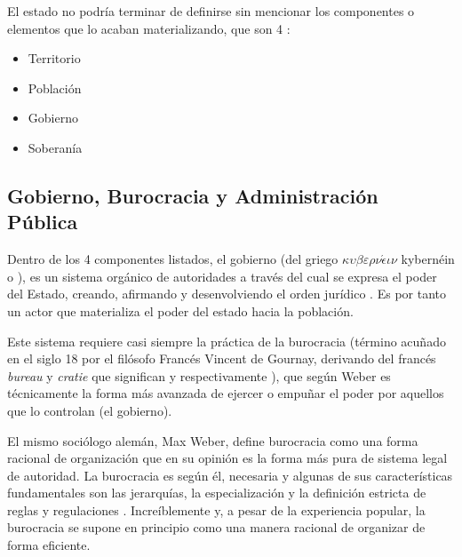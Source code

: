El estado no podría terminar de definirse sin mencionar los componentes o elementos que lo acaban materializando, que son 4 \cite{delarocharadaElementosParaTeoria2019}:

\begin{itemize}
    \item Territorio
    \item Población
    \item Gobierno
    \item Soberanía
\end{itemize}

\subsection{Gobierno, Burocracia y Administración Pública}

Dentro de los 4 componentes listados, el gobierno 
(del griego $\kappa \upsilon \beta \varepsilon \rho \nu \acute{\epsilon} \iota \nu$ kybernéin  o ), 
es un sistema orgánico de autoridades a través del cual se expresa el poder del Estado, creando, afirmando y desenvolviendo el orden jurídico \cite{fernandezruizDerechoParlamentario2023}. 
Es por tanto un actor que materializa el poder del estado hacia la población.

Este sistema requiere casi siempre la práctica de la burocracia 
(término acuñado en el siglo 18 por el filósofo Francés Vincent de Gournay, derivando del francés \textit{bureau} y \textit{cratie} que significan  y  respectivamente \cite{rockmanBureaucracyStructureProcesses2024}), 
que según Weber es técnicamente la forma más avanzada de ejercer o empuñar el poder por aquellos que lo controlan \cite[114]{watersWeberRationalismModern2015} (el gobierno). 

El mismo sociólogo alemán, Max Weber, define burocracia como una forma racional de organización que en su opinión es la forma más pura de sistema legal de autoridad. 
La burocracia es según él, necesaria y algunas de sus características fundamentales son las jerarquías, la especialización y la definición estricta de reglas y regulaciones \cite{archerDictionaryPublicAdministration2022}. 
Increíblemente y, a pesar de la experiencia popular, la burocracia se supone en principio como una manera racional de organizar de forma eficiente.

